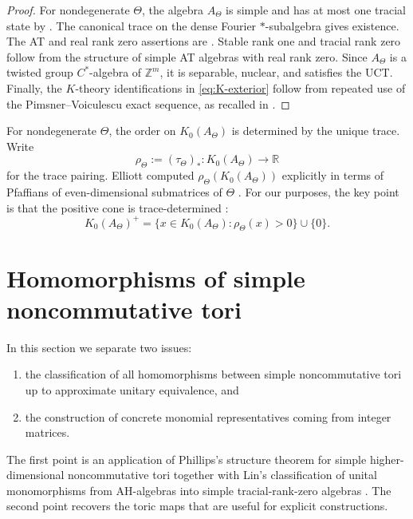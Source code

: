 \documentclass[11pt]{amsart}
\theoremstyle{definition}
\theoremstyle{remark}
\newcommand{\Z}{\mathbb{Z}}
\newcommand{\R}{\mathbb{R}}
\begin{document}
\begin{proof}
For nondegenerate $\Theta$, the algebra $A_\Theta$ is simple and has at
most one tracial state by \cite[Theorem~3.7 and Lemma~3.1]{Slawny}. The
canonical trace on the dense Fourier $*$-subalgebra gives existence. The AT
and real rank zero assertions are \cite[Theorem~3.8]{PhillipsAT}. Stable rank
one and tracial rank zero follow from the structure of simple AT algebras with
real rank zero. Since $A_\Theta$ is a twisted group $C^*$-algebra of
$\Z^m$, it is separable, nuclear, and satisfies the UCT. Finally, the
$K$-theory identifications in \eqref{eq:K-exterior} follow from repeated use
of the Pimsner--Voiculescu exact sequence, as recalled in
\cite{PhillipsAT,RieffelProj}.
\end{proof}

For nondegenerate $\Theta$, the order on $K_0(A_\Theta)$ is determined by
the unique trace. Write \[\rho_\Theta:=(\tau_\Theta)_*\colon K_0(A_\Theta)\to\R\]
for the trace pairing. Elliott computed $\rho_\Theta(K_0(A_\Theta))$
explicitly in terms of Pfaffians of even-dimensional submatrices of
$\Theta$ \cite{Ell84}. For our purposes, the key point is that the positive
cone is trace-determined \cite[Theorem~6.1]{RieffelProj}:
\begin{equation}\label{eq:order-by-trace}
K_0(A_\Theta)^+
=
\{x\in K_0(A_\Theta):\rho_\Theta(x)>0\}\cup\{0\}.
\end{equation}

\section{Homomorphisms of simple noncommutative tori}

In this section we separate two issues:
\begin{enumerate}[label=(\arabic*)]
\item the classification of all homomorphisms between simple noncommutative tori up to approximate unitary equivalence, and
\item the construction of concrete monomial representatives coming from integer matrices.
\end{enumerate}
The first point is an application of Phillips's structure theorem for simple higher-dimensional noncommutative tori together with Lin's classification of unital monomorphisms from AH-algebras into simple tracial-rank-zero algebras \cite{LinRange}. The second point recovers the toric maps that are useful for explicit constructions.
\end{document}
